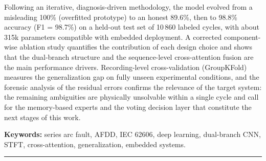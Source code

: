 \medskip

\noindent Following an iterative, diagnosis-driven methodology, the model evolved from a misleading 100\% (overfitted prototype) to an honest 89.6\%, then to 98.8\% accuracy (F1 = 98.7\%) on a held-out test set of 10\,860 labeled cycles, with about 315k parameters compatible with embedded deployment. A corrected component-wise ablation study quantifies the contribution of each design choice and shows that the dual-branch structure and the sequence-level cross-attention fusion are the main performance drivers. Recording-level cross-validation (GroupKFold) measures the generalization gap on fully unseen experimental conditions, and the forensic analysis of the residual errors confirms the relevance of the target system: the remaining ambiguities are physically unsolvable within a single cycle and call for the memory-based experts and the voting decision layer that constitute the next stages of this work.

\vspace{0.5cm}

\noindent\textbf{Keywords:} series arc fault, AFDD, IEC 62606, deep learning, dual-branch CNN, STFT, cross-attention, generalization, embedded systems.

\vspace{0.4cm}
\noindent\rule{\linewidth}{1pt}

\newpage

